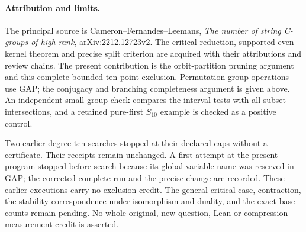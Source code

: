 \documentclass[11pt,a4paper]{article}
\begin{document}
\paragraph{Attribution and limits.}
The principal source is Cameron--Fernandes--Leemans,
\emph{The number of string C-groups of high rank},
arXiv:2212.12723v2. The critical reduction, supported even-kernel
theorem and precise split criterion are acquired with their
attributions and review chains. The present contribution is the
orbit-partition pruning argument and this complete bounded
ten-point exclusion. Permutation-group operations use GAP; the
conjugacy and branching completeness argument is given above.
An independent small-group check compares the interval tests with
all subset intersections, and a retained pure-first $S_{10}$
example is checked as a positive control.

Two earlier degree-ten searches stopped at their declared caps
without a certificate. Their receipts remain unchanged. A first
attempt at the present program stopped before search because its
global variable name was reserved in GAP; the corrected complete
run and the precise change are recorded. These earlier executions
carry no exclusion credit. The general critical case, contraction,
the stability correspondence under isomorphism and duality, and
the exact base counts remain pending. No whole-original, new
question, Lean or compression-measurement credit is asserted.
\end{document}
